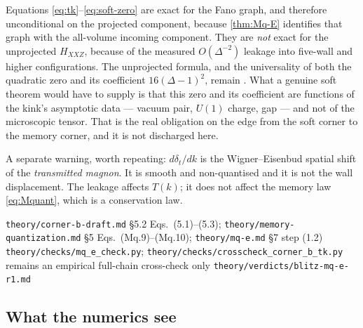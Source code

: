 \begin{scope}
\label{scope:M-tk}
Equations \eqref{eq:tk}--\eqref{eq:soft-zero} are exact for the Fano graph, and
therefore unconditional on the projected component, because \cref{thm:Mq-E}
identifies that graph with the all-volume incoming component. They are
\emph{not} exact for the unprojected $H_{XXZ}$, because of the measured
$O(\Delta^{-2})$ leakage into five-wall and higher configurations. The
unprojected formula, and the universality of both the quadratic zero and its
coefficient $16(\Delta-1)^2$, remain \statusConjecture. What a genuine soft
theorem would have to supply is that this zero and its coefficient are functions
of the kink's asymptotic data --- vacuum pair, $U(1)$ charge, gap --- and not of
the microscopic tensor. That is the real obligation on the edge from the soft
corner to the memory corner, and it is not discharged here.

A separate warning, worth repeating: $d\delta_t/dk$ is the Wigner--Eisenbud
spatial shift of the \emph{transmitted magnon}. It is smooth and non-quantised
and it is not the wall displacement. The leakage affects $T(k)$; it does not
affect the memory law \eqref{eq:Mquant}, which is a conservation law.
\end{scope}

%
{\texttt{theory/corner-b-draft.md} \S5.2 Eqs.\ (5.1)--(5.3);
 \texttt{theory/memory-quantization.md} \S5 Eqs.\ (Mq.9)--(Mq.10);
 \texttt{theory/mq-e.md} \S7 step (1.2)}%
{\texttt{theory/checks/mq\_e\_check.py};
 \texttt{theory/checks/crosscheck\_corner\_b\_tk.py} remains an empirical
 full-chain cross-check only}%
{\texttt{theory/verdicts/blitz-mq-e-r1.md}}

\subsection{What the numerics see}

